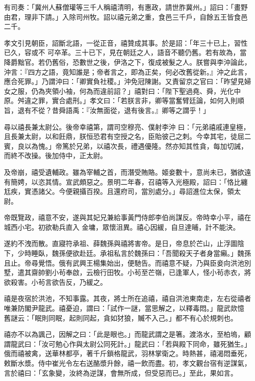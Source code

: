 \begin{pinyinscope}
 有司奏：「冀州人蘇僧瓘等三千人稱禧清明，有惠政，請世胙冀州。」詔曰：「畫野由君，理非下請。」入除司州牧。詔以禧元弟之重，食邑三千戶，自餘五王皆食邑二千。



 孝文引見朝臣，詔斷北語，一從正音，禧贊成其事。於是詔：「年三十已上，習性已久，容或不
 可卒革。三十已下，見在朝廷之人，語音不聽仍舊。若有故為，當降爵黜官。若仍舊俗，恐數世之後，伊洛之下，復成被髮之人。朕嘗與李沖論此，沖言：『四方之語，竟知誰是；帝者言之，即為正矣，何必改舊從新。』沖之此言，應合死罪。」乃謂沖曰：「卿實負社稷。」沖免冠陳謝。又責留京之官曰：「昨望見婦女之服，仍為夾領小袖，何為而違前詔？」禧對曰：「陛下聖過堯、舜，光化中原。舛違之罪，實合處刑。」孝文曰：「若朕言非，卿等當奮臂廷論，如何入則順旨，退有不從？昔舜語禹：『汝無面從，退有後言。』卿等之謂乎！」



 尋以禧長兼太尉公。後帝幸禧第，謂司空穆亮、僕射李沖
 曰：「元弟禧戚連皇極，且長兼太尉，以和飪鼎，朕恒恐君有空授之名，臣貽彼己之刺。今幸其宅，徒屈二賓，良以為愧。」帝篤於兄弟，以禧次長，禮遇優隆。然亦知其性貪，每加切誡，而終不改操。後加侍中，正太尉。



 及帝崩，禧受遺輔政。雖為宰輔之首，而潛受賄賂。姬妾數十，意尚未已，猶欲遠有簡娉，以恣其情。宣武頗惡之。景明二年春，召禧等入光極殿，詔曰：「恪比纏尪疾，實憑諸父。今便親攝百揆。且還府司，當別處分。」尋詔進位太保，領太尉。



 帝既覽政，禧意不安，遂與其妃兄兼給事黃門侍郎李伯尚謀反。帝時幸小平，禧在城西小宅。初欲勒兵直入
 金墉，眾懷沮異。禧心因緩，自旦達晡，計不能決。



 遂約不洩而散。直寢符承祖、薛魏孫與禧將害帝。是日，帝息於芒山，止浮圖陰下，少時睡臥，魏孫便欲赴廷。承祖私言於魏孫曰：「吾聞殺天子者身當癩。」魏孫且止。帝尋覺悟。俄有武興王楊集始出，便馳告。而禧意不疑，乃與臣妾向洪池別墅，遣其齋帥劉小茍奉啟，云檢行田牧。小茍至芒嶺，已逢軍人，怪小茍赤衣，將欲殺害。小茍言欲告反，乃緩之。



 禧是夜宿於洪池，不知事露。其夜，將士所在追禧，禧自洪池東南走，左右從禧者唯兼防閣尹龍武。禧憂迫，謂曰：「試作一謎，當思解之，以釋毒悶。」龍武欻憶
 舊謎云：「眠則同眠，起則同起，貪如犲狼，贓不入己。」都不有心於規刺也。



 禧亦不以為諷己，因解之曰：「此是眼也。」而龍武謂之是箸。渡洛水，至柏塢，顧謂龍武曰：「汝可勉心作與太尉公同死計。」龍武曰：「若與殿下同命，雖死猶生。」俄而禧被禽，送華林都亭，著千斤鎖格龍武，羽林掌衛之。時熱甚，禧渴悶垂死，敕斷水漿。侍中崔光令左右送酪漿升餘，禧一飲而盡。初，孝文觀台宿有逆謀氣，言於禧曰：「玄象變，汝終為逆謀，會無所成，但受惡而已。」至此，果如言。




\end{pinyinscope}

